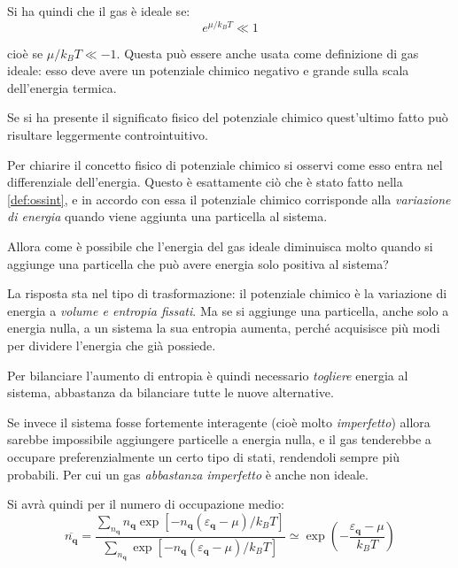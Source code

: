 Si ha quindi che il gas è ideale se:
\begin{equation*}
e^{\mu/k_B T} \ll 1
\end{equation*}

cioè se $\mu/k_B T \ll -1$. Questa può essere anche usata come definizione di gas ideale: esso deve avere un potenziale chimico negativo e grande sulla scala dell'energia termica.

\begin{oss}
	Se si ha presente il significato fisico del potenziale chimico quest'ultimo fatto può risultare leggermente controintuitivo.
	
	Per chiarire il concetto fisico di potenziale chimico si osservi come esso entra nel differenziale dell'energia. Questo è esattamente ciò che è stato fatto nella \cref{def:ossint}, e in accordo con essa il potenziale chimico corrisponde alla \textit{variazione di energia} quando viene aggiunta una particella al sistema.
	
	Allora come è possibile che l'energia del gas ideale diminuisca molto quando si aggiunge una particella che può avere energia solo positiva al sistema?
	
	\noindent La risposta sta nel tipo di trasformazione: il potenziale chimico è la variazione di energia a \textit{volume e entropia fissati}. Ma se si aggiunge una particella, anche solo a energia nulla, a un sistema la sua entropia aumenta, perché acquisisce più modi per dividere l'energia che già possiede.
	
	\noindent Per bilanciare l'aumento di entropia è quindi necessario \textit{togliere} energia al sistema, abbastanza da bilanciare tutte le nuove alternative.
	
	Se invece il sistema fosse fortemente interagente (cioè molto \textit{imperfetto}) allora sarebbe impossibile aggiungere particelle a energia nulla, e il gas tenderebbe a occupare preferenzialmente un certo tipo di stati, rendendoli sempre più probabili. Per cui un gas \textit{abbastanza imperfetto} è anche non ideale.
\end{oss}

Si avrà quindi per il numero di occupazione medio:
\begin{equation*}
	\overline{n_{\textbf{q}}} = \frac{\sum_{n_{\textbf{q}}} n_{\textbf{q}}\exp [ - {n_{\textbf{q}}{(\varepsilon_{\textbf{q}} - \mu)}}/{k_B T}]}{\sum_{n_{\textbf{q}}} \exp [ - {n_{\textbf{q}}{(\varepsilon_{\textbf{q}} - \mu)}}/{k_B T}]} \simeq \exp \left( - \frac{{\varepsilon_{\textbf{q}} - \mu}}{k_B T}\right)
\end{equation*}

